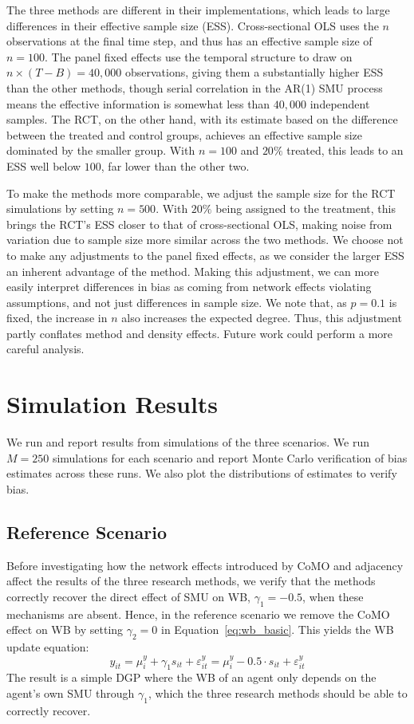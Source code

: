 The three methods are different in their implementations, which leads to large differences in their effective sample size (ESS). Cross-sectional OLS uses the $n$ observations at the final time step, and thus has an effective sample size of $n = 100$. The panel fixed effects use the temporal structure to draw on $n \times (T - B) = 40{,}000$ observations, giving them a substantially higher ESS than the other methods, though serial correlation in the AR(1) SMU process means the effective information is somewhat less than $40{,}000$ independent samples. The RCT, on the other hand, with its estimate based on the difference between the treated and control groups, achieves an effective sample size dominated by the smaller group. With $n = 100$ and $20\%$ treated, this leads to an ESS well below $100$, far lower than the other two.

To make the methods more comparable, we adjust the sample size for the RCT simulations by setting $n = 500$. With $20\%$ being assigned to the treatment, this brings the RCT's ESS closer to that of cross-sectional OLS, making noise from variation due to sample size more similar across the two methods. We choose not to make any adjustments to the panel fixed effects, as we consider the larger ESS an inherent advantage of the method. Making this adjustment, we can more easily interpret differences in bias as coming from network effects violating assumptions, and not just differences in sample size. We note that, as $p = 0.1$ is fixed, the increase in $n$ also increases the expected degree. Thus, this adjustment partly conflates method and density effects. Future work could perform a more careful analysis.

\section{Simulation Results}
\label{sec:abm:results}
We run and report results from simulations of the three scenarios. We run $M = 250$ simulations for each scenario and report Monte Carlo verification of bias estimates across these runs. We also plot the distributions of estimates to verify bias.

\subsection{Reference Scenario}
\label{sec:abm:reference}
Before investigating how the network effects introduced by CoMO and adjacency affect the results of the three research methods, we verify that the methods correctly recover the direct effect of SMU on WB, $\gamma_1 = -0.5$, when these mechanisms are absent. Hence, in the reference scenario we remove the CoMO effect on WB by setting $\gamma_2 = 0$ in Equation~\eqref{eq:wb_basic}. This yields the WB update equation:
\begin{equation}
    y_{it} = \mu^y_i + \gamma_1 s_{it} + \varepsilon^y_{it} = \mu^y_i - 0.5 \cdot s_{it} + \varepsilon^y_{it}
    \label{eq:wb_reference}
\end{equation}
The result is a simple DGP where the WB of an agent only depends on the agent's own SMU through $\gamma_1$, which the three research methods should be able to correctly recover.

